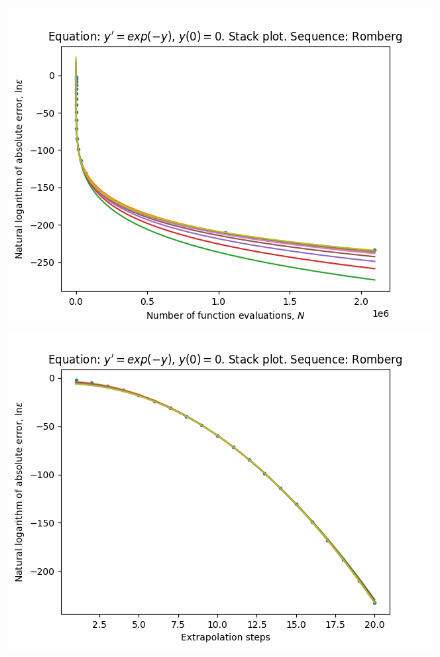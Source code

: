 \begin{figure}[H]
\centering
\begin{minipage}{0.45\textwidth}
\centering
\includegraphics[scale=0.45]{../results/emr_plots/ln_e0_hp_romberg_stack.png}
\end{minipage}
\begin{minipage}{0.45\textwidth}
\centering
\includegraphics[scale=0.45]{../results/emr_plots/ln_e0_hp_romberg_steps_stack.png}
\end{minipage}
\end{figure}

